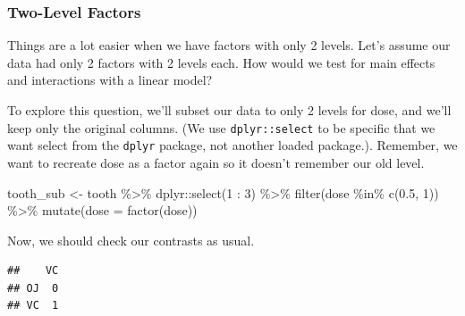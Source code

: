 \documentclass[
]{book}
\newenvironment{Shaded}{\begin{snugshade}}{\end{snugshade}}
\newcommand{\AttributeTok}[1]{\textcolor[rgb]{0.77,0.63,0.00}{#1}}
\newcommand{\DecValTok}[1]{\textcolor[rgb]{0.00,0.00,0.81}{#1}}
\newcommand{\FloatTok}[1]{\textcolor[rgb]{0.00,0.00,0.81}{#1}}
\newcommand{\FunctionTok}[1]{\textcolor[rgb]{0.00,0.00,0.00}{#1}}
\newcommand{\NormalTok}[1]{#1}
\newcommand{\OtherTok}[1]{\textcolor[rgb]{0.56,0.35,0.01}{#1}}
\newcommand{\SpecialCharTok}[1]{\textcolor[rgb]{0.00,0.00,0.00}{#1}}
\begin{document}
\hypertarget{two-level-factors}{%
\subsubsection{Two-Level Factors}\label{two-level-factors}}

Things are a lot easier when we have factors with only 2 levels. Let's assume our data had only 2 factors with 2 levels each. How would we test for main effects and interactions with a linear model?

To explore this question, we'll subset our data to only 2 levels for dose, and we'll keep only the original columns. (We use \texttt{dplyr::select} to be specific that we want select from the \texttt{dplyr} package, not another loaded package.). Remember, we want to recreate dose as a factor again so it doesn't remember our old level.

\begin{Shaded}
\begin{Highlighting}[]
\NormalTok{tooth\_sub }\OtherTok{\textless{}{-}}\NormalTok{ tooth }\SpecialCharTok{\%\textgreater{}\%} 
\NormalTok{  dplyr}\SpecialCharTok{::}\FunctionTok{select}\NormalTok{(}\DecValTok{1} \SpecialCharTok{:} \DecValTok{3}\NormalTok{) }\SpecialCharTok{\%\textgreater{}\%}
  \FunctionTok{filter}\NormalTok{(dose }\SpecialCharTok{\%in\%} \FunctionTok{c}\NormalTok{(}\FloatTok{0.5}\NormalTok{, }\DecValTok{1}\NormalTok{)) }\SpecialCharTok{\%\textgreater{}\%}
  \FunctionTok{mutate}\NormalTok{(}\AttributeTok{dose =} \FunctionTok{factor}\NormalTok{(dose))}
\end{Highlighting}
\end{Shaded}

Now, we should check our contrasts as usual.

\begin{Shaded}
\end{Shaded}

\begin{verbatim}
##    VC
## OJ  0
## VC  1
\end{verbatim}

\begin{Shaded}
\end{Shaded}
\end{document}
